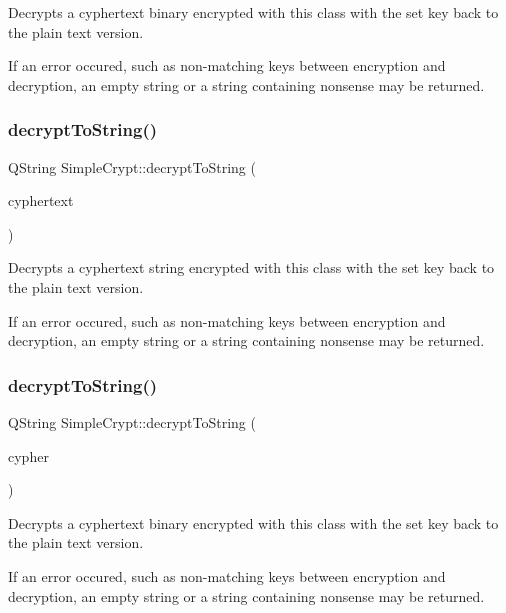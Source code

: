 Decrypts a cyphertext binary encrypted with this class with the set key back to the plain text version.

If an error occured, such as non-\/matching keys between encryption and decryption, an empty string or a string containing nonsense may be returned. \mbox{\label{classSimpleCrypt_aa454cf372b534fd5ffaa2c5bd0fa57ea}} 
\subsubsection{\texorpdfstring{decrypt\+To\+String()}{decryptToString()}\hspace{0.1cm}{\footnotesize\ttfamily [1/2]}}
{\footnotesize\ttfamily Q\+String Simple\+Crypt\+::decrypt\+To\+String (\begin{DoxyParamCaption}\item[{const Q\+String \&}]{cyphertext }\end{DoxyParamCaption})}

Decrypts a cyphertext string encrypted with this class with the set key back to the plain text version.

If an error occured, such as non-\/matching keys between encryption and decryption, an empty string or a string containing nonsense may be returned. \mbox{\label{classSimpleCrypt_ad1a3257cefee43773803ec1b12654f92}} 
\subsubsection{\texorpdfstring{decrypt\+To\+String()}{decryptToString()}\hspace{0.1cm}{\footnotesize\ttfamily [2/2]}}
{\footnotesize\ttfamily Q\+String Simple\+Crypt\+::decrypt\+To\+String (\begin{DoxyParamCaption}\item[{Q\+Byte\+Array}]{cypher }\end{DoxyParamCaption})}

Decrypts a cyphertext binary encrypted with this class with the set key back to the plain text version.

If an error occured, such as non-\/matching keys between encryption and decryption, an empty string or a string containing nonsense may be returned. \mbox{\label{classSimpleCrypt_ae1991c7748b2bb74468bee0be372d2c4}} 
